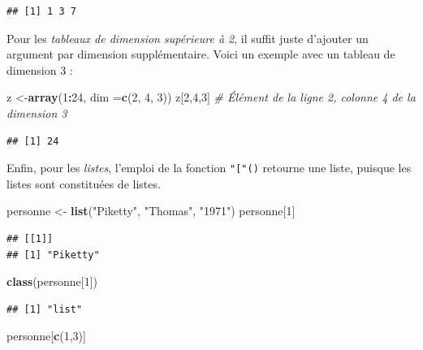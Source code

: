 \documentclass[
  11pt,
]{book}
\newenvironment{Shaded}{\begin{snugshade}}{\end{snugshade}}
\newcommand{\CommentTok}[1]{\textcolor[rgb]{0.56,0.35,0.01}{\textit{#1}}}
\newcommand{\DataTypeTok}[1]{\textcolor[rgb]{0.13,0.29,0.53}{#1}}
\newcommand{\DecValTok}[1]{\textcolor[rgb]{0.00,0.00,0.81}{#1}}
\newcommand{\KeywordTok}[1]{\textcolor[rgb]{0.13,0.29,0.53}{\textbf{#1}}}
\newcommand{\NormalTok}[1]{#1}
\newcommand{\OperatorTok}[1]{\textcolor[rgb]{0.81,0.36,0.00}{\textbf{#1}}}
\newcommand{\StringTok}[1]{\textcolor[rgb]{0.31,0.60,0.02}{#1}}
\numberwithin{equation}{section}
\numberwithin{countremarque}{section}
\begin{document}
\begin{lstlisting}
## [1] 1 3 7
\end{lstlisting}

Pour les \emph{tableaux de dimension supérieure à 2}, il suffit juste d'ajouter un argument par dimension supplémentaire. Voici un exemple avec un tableau de dimension 3 :

\begin{Shaded}
\begin{Highlighting}[]
\NormalTok{z \textless{}{-}}\KeywordTok{array}\NormalTok{(}\DecValTok{1}\OperatorTok{:}\DecValTok{24}\NormalTok{, }\DataTypeTok{dim =}\KeywordTok{c}\NormalTok{(}\DecValTok{2}\NormalTok{, }\DecValTok{4}\NormalTok{, }\DecValTok{3}\NormalTok{))}
\NormalTok{z[}\DecValTok{2}\NormalTok{,}\DecValTok{4}\NormalTok{,}\DecValTok{3}\NormalTok{]  }\CommentTok{\# Élément de la ligne 2, colonne 4 de la dimension 3}
\end{Highlighting}
\end{Shaded}

\begin{lstlisting}
## [1] 24
\end{lstlisting}

Enfin, pour les \emph{listes}, l'emploi de la fonction \texttt{"{[}"()} retourne une liste, puisque les listes sont constituées de listes.

\begin{Shaded}
\begin{Highlighting}[]
\NormalTok{personne \textless{}{-}}\StringTok{ }\KeywordTok{list}\NormalTok{(}\StringTok{"Piketty"}\NormalTok{, }\StringTok{"Thomas"}\NormalTok{, }\StringTok{"1971"}\NormalTok{)}
\NormalTok{personne[}\DecValTok{1}\NormalTok{]}
\end{Highlighting}
\end{Shaded}

\begin{lstlisting}
## [[1]]
## [1] "Piketty"
\end{lstlisting}

\begin{Shaded}
\begin{Highlighting}[]
\KeywordTok{class}\NormalTok{(personne[}\DecValTok{1}\NormalTok{])}
\end{Highlighting}
\end{Shaded}

\begin{lstlisting}
## [1] "list"
\end{lstlisting}

\begin{Shaded}
\begin{Highlighting}[]
\NormalTok{personne[}\KeywordTok{c}\NormalTok{(}\DecValTok{1}\NormalTok{,}\DecValTok{3}\NormalTok{)]}
\end{Highlighting}
\end{Shaded}
\end{document}
